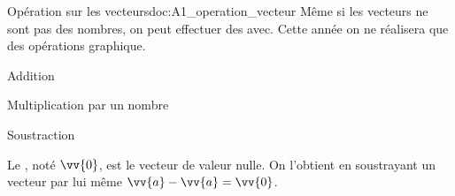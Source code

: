 \begin{doc}{Opération sur les vecteurs}{doc:A1_operation_vecteur}
  Même si les vecteurs ne sont pas des nombres, on peut effectuer des  avec.
  Cette année on ne réalisera que des opérations graphique.
  \begin{multicols}{3}
    \centering
    \begin{boite}
      \vAligne{50pt}
    \end{boite}
    Addition
    
    \begin{boite}
      \vAligne{50pt}
    \end{boite}
    Multiplication par un nombre

    \begin{boite}
      \vAligne{50pt}
    \end{boite}
    Soustraction
  \end{multicols}

  \begin{importants}
    Le , noté $\vv{0}$, est le vecteur de valeur nulle.
    On l'obtient en soustrayant un vecteur par lui même $\vv{a} - \vv{a} = \vv{0}$.
  \end{importants}
\end{doc}
